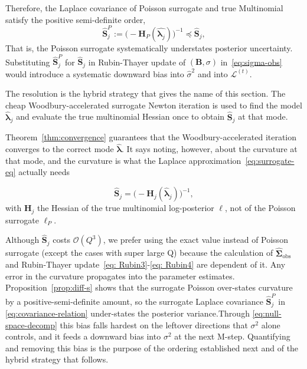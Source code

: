 Therefore, the Laplace covariance of Poisson surrogate and true Multinomial satisfy the positive semi-definite order, 
\begin{equation}
    \hat{\mathbf{S}}_{j}^{P}:=\bigl(-\mathbf{H}_{P}(\hat{\bm{\lambda}_{j}})\bigr)^{-1}\preceq \hat{\mathbf{S}}_{j}, 
    \label{eq:covariance-relation}
\end{equation}
That is, the Poisson surrogate systematically understates posterior uncertainty. Substituting $\hat{\mathbf{S}}_{j}^{P}$ for $\hat{\mathbf{S}}_{j}$ in Rubin-Thayer update of $(\mathbf{B},\sigma)$ in~\eqref{eq:sigma-obs} would introduce a systematic downward bias into $\hat{\sigma}^{2}$ and into $\mathcal{L}^{(t)}$.

The resolution is the hybrid strategy that gives the name of this section. The cheap Woodbury-accelerated surrogate Newton iteration is used to find the model $\hat{\bm{\lambda}}_{j}$ and evaluate the true multinomial Hessian once to obtain $\hat{\mathbf{S}}_{j}$ at that mode.

Theorem~\ref{thm:convergence} guarantees that the Woodbury-accelerated iteration converges to the correct mode $\hat{\bm{\lambda}}$. It says noting, however, about the curvature at that mode, and the curvature is what the Laplace approximation~\eqref{eq:surrogate-eq} actually needs

\begin{equation}
    \hat{\mathbf{S}}_{j}=\bigl(-\mathbf{H}_{j}(\hat{\bm{\lambda}}_{j})\bigr)^{-1},
\end{equation}
with $\mathbf{H}_{j}$ the Hessian of the true multinomial log-posterior $\ell$, not of the Poisson surrogate $\ell_{P}$. 

Although $\hat{\mathbf{S}}_{j}$ costs $\mathcal{O}(Q^{3})$, we prefer using the exact value instead of Poisson surrogate (except the cases with super large Q) because the calculation of $\hat{\bm{\Sigma}}_{\text{obs}}$ and Rubin-Thayer update~\eqref{eq: Rubin3}-\eqref{eq: Rubin4} are dependent of it. Any error in the curvature propagates into the parameter estimates. Proposition~\ref{prop:diff-s} shows that the surrogate Poisson over-states curvature by a positive-semi-definite amount, so the surrogate Laplace covariance $\hat{\mathbf{S}}_{j}^{P}$ in \eqref{eq:covariance-relation} under-states the posterior variance.Through \eqref{eq:null-space-decomp} this bias falls hardest on the leftover directions that $\sigma^{2}$ alone controls, and it feeds a downward bias into $\sigma^{2}$ at the next M-step. Quantifying and removing this bias is the purpose of the ordering established next and of the hybrid strategy that follows.

